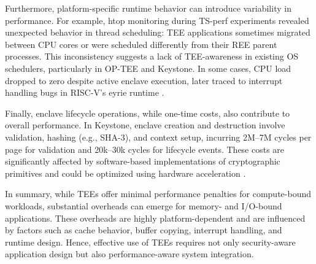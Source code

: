 Furthermore, platform-specific runtime behavior can introduce variability in performance. For example, htop monitoring during TS-perf experiments revealed unexpected behavior in thread scheduling: TEE applications sometimes migrated between CPU cores or were scheduled differently from their REE parent processes. This inconsistency suggests a lack of TEE-awareness in existing OS schedulers, particularly in OP-TEE and Keystone. In some cases, CPU load dropped to zero despite active enclave execution, later traced to interrupt handling bugs in RISC-V’s eyrie runtime \cite{Suzaki2021}.

Finally, enclave lifecycle operations, while one-time costs, also contribute to overall performance. In Keystone, enclave creation and destruction involve validation, hashing (e.g., SHA-3), and context setup, incurring 2M–7M cycles per page for validation and 20k–30k cycles for lifecycle events. These costs are significantly affected by software-based implementations of cryptographic primitives and could be optimized using hardware acceleration \cite{dayeol2019keystone}.

In summary, while TEEs offer minimal performance penalties for compute-bound workloads, substantial overheads can emerge for memory- and I/O-bound applications. These overheads are highly platform-dependent and are influenced by factors such as cache behavior, buffer copying, interrupt handling, and runtime design. Hence, effective use of TEEs requires not only security-aware application design but also performance-aware system integration.

